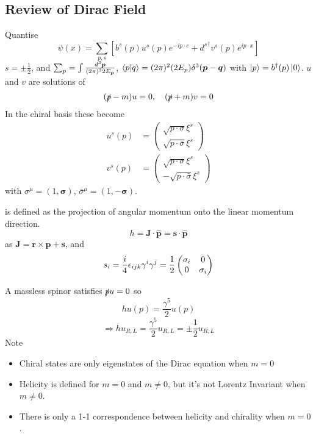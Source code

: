 \documentclass{article}
\begin{document}
\subsection{Review of Dirac Field}
Quantise 
\[
\psi(x) = \sum_{p,s} \left[ b^s(p) u^s(p) e^{-ip\cdot c} + {d^s}^\dagger v^s(p) e^{ip\cdot x} \right]
\]
$s=\pm\frac{1}{2}$, and $\sum_p = \int \frac{d^3\bm{p}}{(2\pi)^32E_{\bm{p}}}$, $\braket{p|q} = (2\pi)^2 (2E_p)\delta^3(\bm{p}-\bm{q})$ with $\ket{p} = b^\dagger(p) \ket{0}$. $u$ and $v$ are solutions of 
\[
(\slashed{p}-m)u=0 , \quad (\slashed{p}+m)v=0
\]
In the chiral basis these become 
\begin{align*}
    u^s(p) &= \begin{pmatrix} \sqrt{p\cdot \sigma} \xi^s \\ \sqrt{p\cdot\bar{\sigma}} \xi^s \end{pmatrix} \\ 
    v^s(p) &= \begin{pmatrix} \sqrt{p\cdot \sigma} \xi^s \\ -\sqrt{p\cdot\bar{\sigma}} \xi^s \end{pmatrix}
\end{align*}
with $\sigma^\mu = (1, \bm{\sigma})$, $\bar{\sigma}^\mu = (1, -\bm{\sigma})$. 

\begin{definition}[Helicity]
 is defined as the projection of angular momentum onto the linear momentum direction. 
\[
h = \bm{J} \cdot \hat{\bm{p}} = \bm{s} \cdot \hat{\bm{p}}
\]
as $\bm{J} = \bm{r}\times\bm{p} + \bm{s}$, and 
\[
s_i = \frac{i}{4}\epsilon_{ijk} \gamma^i \gamma^j = \frac{1}{2} \begin{pmatrix} \sigma_i & 0 \\ 0 & \sigma_i \end{pmatrix}
\]
\end{definition}
A massless spinor satisfies $\slashed{p}u=0$
so 
\[
hu(p) = \frac{\gamma^5}{2} u(p) 
\]
\[
\Rightarrow hu_{R,L} = \frac{\gamma^5}{2} u_{R,L} = \pm \frac{1}{2} u_{R,L}
\]
Note
\begin{itemize}
     \item Chiral states are only eigenstates of the Dirac equation when $m=0$
     \item Helicity is defined for $m=0$ and $m\neq0$, but it's not Lorentz Invariant when $m\neq 0$. 
     \item There is only a 1-1 correspondence between helicity and chirality when $m=0$. 
\end{itemize}
\end{document}
